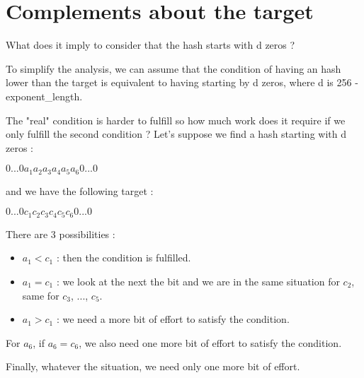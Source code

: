 \chapter{Complements about the target} \label{appendixTarget}

What does it imply to consider that the hash starts with d zeros ? \newline

To simplify the analysis, we can assume that the condition of having an hash lower than the target is equivalent to having starting by d zeros, where d is 256 - exponent\_length. \newline

The "real" condition is harder to fulfill so how much work does it require if we only fulfill the second condition ?
Let's suppose we find a hash starting with d zeros : \newline

$0 ... 0 a_1 a_2 a_3 a_4 a_5 a_6 0 ... 0$ \newline

and we have the following target : \newline

$0 ... 0 c_1 c_2 c_3 c_4 c_5 c_6 0 ... 0$ \newline

There are 3 possibilities : \newline

\begin{itemize}
  \item $a_1 < c_1$ : then the condition is fulfilled.
  \item $a_1 = c_1$ : we look at the next the bit and we are in the same situation for $c_2$, same for $c_3$, ..., $c_5$.
  \item $a_1 > c_1$ : we need a more bit of effort to satisfy the condition.
\end{itemize}

For $a_6$, if $a_6 = c_6$, we also need one more bit of effort to satisfy the condition.

Finally, whatever the situation, we need only one more bit of effort.
